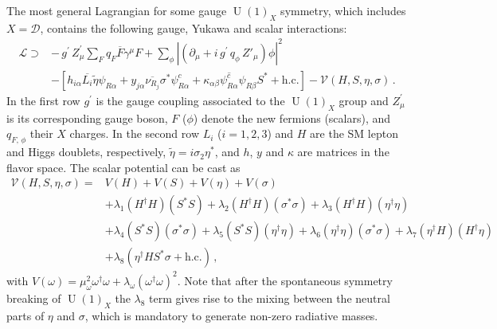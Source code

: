 \documentclass[12pt]{article}
\begin{document}
The most general Lagrangian for some gauge $\operatorname{U}(1)_X$ symmetry, which includes $X=\mathcal{D}$, contains the following gauge, Yukawa and scalar interactions:
%
\begin{align}
\label{eq:LagY}
    \mathcal{L} \supset& -\,g^{\prime}\,Z_\mu^\prime\sum_{F}q_{F}\overline{F} \gamma^\mu F+\sum_{\phi}\left|\left( \partial_\mu +i\,g^{\prime}\,q_\phi\,Z'_\mu \right) \phi\right|^2\nonumber\\
    &-[ 
    h_{i\alpha} \overline{L_{i}} \tilde{\eta} \psi_{R\alpha} +  y_{j\alpha} \overline{\nu_{R_{j}}} \sigma^* \psi^c_{R\alpha} + \kappa_{\alpha\beta} \overline{\psi^{c}_{R\alpha}} \psi_{R\beta} S^* + \text{h.c.}] - \mathcal{V}(H, S, \eta, \sigma)\,.
\end{align}
%
In the first row $g^{\prime}$ is the gauge coupling associated to the $\operatorname{U}(1)_X$ group and $Z_\mu^\prime$ is its corresponding gauge boson, $F$ ($\phi$) denote the new fermions (scalars), and $q_{F,\,\phi}$ their $X$ charges. In the second row
$L_{i}$ ($i=1,2,3$) and $H$ are the SM lepton and Higgs doublets, respectively,  $\widetilde{\eta} = i \sigma_2 \eta^*$, and $h$, $y$ and $\kappa$ are matrices in the flavor space. 
The scalar potential can be cast as
%
\begin{align}
    \mathcal{V}(H, S, \eta, \sigma) = & V(H) + V(S) + V(\eta) + V(\sigma) \nonumber\\
    &+  \lambda_{1} (H^{\dagger} H ) (S^{*} S) + \lambda_{2} (H^{\dagger} H ) (\sigma^{*} \sigma ) + \lambda_{3} (H^{\dagger} H ) (\eta^{\dagger} \eta )\nonumber\\
    &+ \lambda_{4} (S^{*} S) (\sigma^{*} \sigma ) + \lambda_{5} (S^{*} S) (\eta^{\dagger} \eta ) + \lambda_{6} (\eta^{\dagger} \eta ) (\sigma^{*} \sigma ) + \lambda_{7} (\eta^{\dagger} H ) (H^{\dagger} \eta ) \nonumber\\
    &+ \lambda_{8} (\eta^{\dagger} H S^{*} \sigma + \text{h.c.})\,,
\end{align}
%
%
%
with $V(\omega) = \mu^{2}_{\omega} \omega^{\dagger} \omega + \lambda_{\omega} (\omega^{\dagger} \omega)^{2}$. 
Note that after the spontaneous symmetry breaking of $\operatorname{U}(1)_X$ the $\lambda_8$ term gives rise to the mixing between the neutral parts of $\eta$ and $\sigma$, which is mandatory to generate non-zero radiative masses. 
\end{document}
